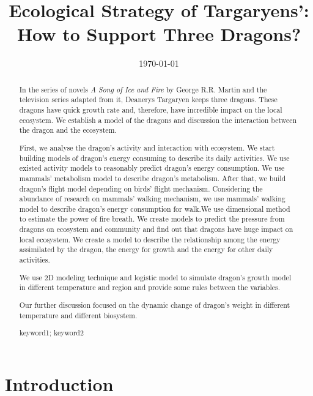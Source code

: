 \documentclass{mcmthesis}
\title{Ecological Strategy of Targaryens': How to Support Three Dragons?}
\date{\today}
\begin{document}
\begin{abstract}
In the series of novels \textit{A Song of Ice and Fire} by George R.R. Martin and the television series adapted from it, Deanerys Targaryen keeps three dragons. These dragons have quick growth rate and, therefore, have incredible impact on the local ecosystem. We establish a model of the dragons and discussion the interaction between the dragon and the ecosystem.

First, we analyse the dragon’s activity and interaction with ecosystem. We start building models of dragon’s energy consuming to describe its daily activities. We use existed activity models to reasonably predict dragon’s energy consumption. We use mammals’ metabolism model to describe dragon’s metabolism. After that, we build dragon’s flight model depending on birds' flight mechanism. Considering the abundance of research on mammals' walking mechanism, we use mammals’ walking model to describe dragon’s energy consumption for walk.We use dimensional method to estimate the power of fire breath. We create models to predict the pressure from dragons on ecosystem and community and find out that dragons have huge impact on local ecosystem. We create a model to describe the relationship among the energy assimilated by the dragon, the energy for growth and the energy for other daily activities.

We use 2D modeling technique and logistic model to simulate dragon’s growth model in different temperature and region and provide some rules between the variables.

Our further discussion focused on the dynamic change of dragon’s weight in different temperature and different biosystem.
\begin{keywords}
keyword1; keyword2
\end{keywords}
\end{abstract}
\maketitle

\tableofcontents

\newpage

\section{Introduction}

\end{document}
